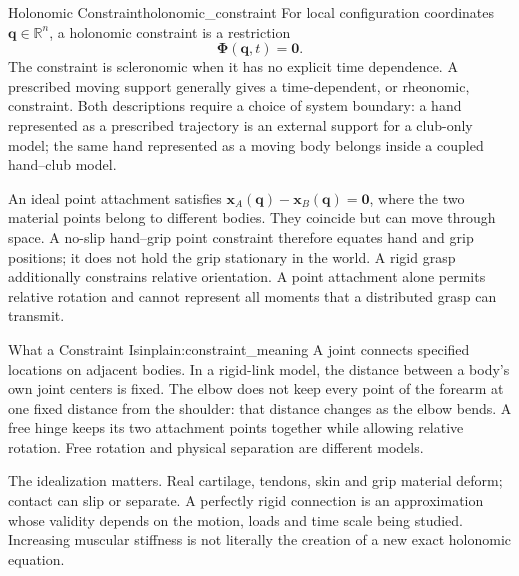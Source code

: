 \begin{definition}{Holonomic Constraint}{holonomic_constraint}
For local configuration coordinates $\bm q\in\mathbb R^n$, a holonomic constraint is a restriction
\begin{equation}
\bm\Phi(\bm q,t)=\bm0.
\label{eq:holonomic_constraint_general}
\end{equation}
The constraint is scleronomic when it has no explicit time dependence. A prescribed moving support generally gives a time-dependent, or rheonomic, constraint. Both descriptions require a choice of system boundary: a hand represented as a prescribed trajectory is an external support for a club-only model; the same hand represented as a moving body belongs inside a coupled hand--club model.

An ideal point attachment satisfies $\bm x_A(\bm q)-\bm x_B(\bm q)=\bm0$, where the two material points belong to different bodies. They coincide but can move through space. A no-slip hand--grip point constraint therefore equates hand and grip positions; it does not hold the grip stationary in the world. A rigid grasp additionally constrains relative orientation. A point attachment alone permits relative rotation and cannot represent all moments that a distributed grasp can transmit.
\end{definition}

\begin{laymansbox}{What a Constraint Is}{inplain:constraint_meaning}
A joint connects specified locations on adjacent bodies. In a rigid-link model, the distance between a body's own joint centers is fixed. The elbow does not keep every point of the forearm at one fixed distance from the shoulder: that distance changes as the elbow bends. A free hinge keeps its two attachment points together while allowing relative rotation. Free rotation and physical separation are different models.

The idealization matters. Real cartilage, tendons, skin and grip material deform; contact can slip or separate. A perfectly rigid connection is an approximation whose validity depends on the motion, loads and time scale being studied. Increasing muscular stiffness is not literally the creation of a new exact holonomic equation.
\end{laymansbox}

